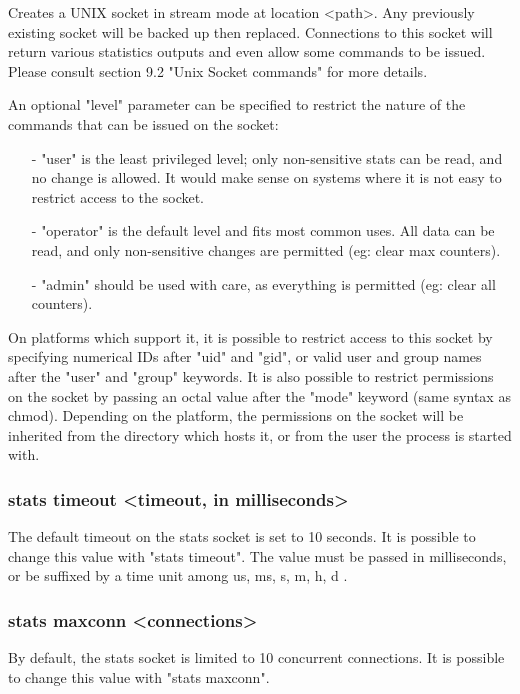   Creates a UNIX socket in stream mode at location <path>. Any previously
  existing socket will be backed up then replaced. Connections to this socket
  will return various statistics outputs and even allow some commands to be
  issued. Please consult section 9.2 "Unix Socket commands" for more details.
  
  An optional "level" parameter can be specified to restrict the nature of
  the commands that can be issued on the socket:
  
  \begin{itemize}
    \item[-] "user" is the least privileged level; only non-sensitive stats can be
      read, and no change is allowed. It would make sense on systems where it
      is not easy to restrict access to the socket.

    \item[-] "operator" is the default level and fits most common uses. All data can
      be read, and only non-sensitive changes are permitted (eg: clear max
      counters).

    \item[-] "admin" should be used with care, as everything is permitted (eg: clear
      all counters).
  \end{itemize}
  
  On platforms which support it, it is possible to restrict access to this
  socket by specifying numerical IDs after "uid" and "gid", or valid user and
  group names after the "user" and "group" keywords. It is also possible to
  restrict permissions on the socket by passing an octal value after the "mode"
  keyword (same syntax as chmod). Depending on the platform, the permissions on
  the socket will be inherited from the directory which hosts it, or from the
  user the process is started with.

\subsubsection[stats timeout]{stats timeout <timeout, in milliseconds>}
  The default timeout on the stats socket is set to 10 seconds. It is possible
  to change this value with "stats timeout". The value must be passed in
  milliseconds, or be suffixed by a time unit among { us, ms, s, m, h, d }.

\subsubsection[stats maxconn]{stats maxconn <connections>}
  By default, the stats socket is limited to 10 concurrent connections. It is
  possible to change this value with "stats maxconn".

